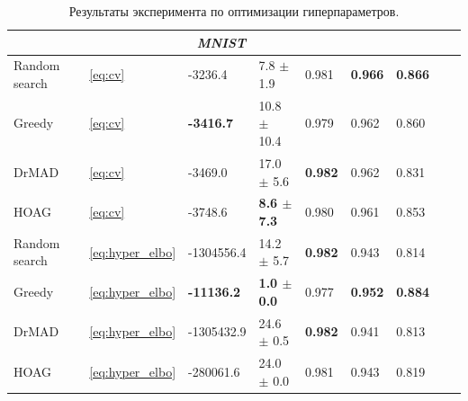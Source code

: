 \begin{table}
\begin{tabularx}{\textwidth}{ |X|X|X|X|X|X|X|X|X|}
\multicolumn{7}{|c|}{\textit{MNIST}}  \\
\hline
Random search & ~\eqref{eq:cv} & -3236.4  & 7.8 $\pm$ 1.9  &   0.981 & \bf 0.966 & \bf 0.866 \\
\hline
Greedy & ~\eqref{eq:cv} & \bf -3416.7 & 10.8 $\pm$ 10.4 & 0.979 & 0.962 & 0.860\\
\hline
DrMAD & ~\eqref{eq:cv} & -3469.0 & 17.0 $\pm$ 5.6 & \bf  0.982 & 0.962 & 0.831\\
\hline
HOAG & ~\eqref{eq:cv} & -3748.6 & \bf 8.6 $\pm$ 7.3&   0.980 &  0.961  & 0.853 \\
\hline
Random search & ~\eqref{eq:hyper_elbo} & -1304556.4 &  14.2 $\pm$ 5.7 &  \bf 0.982 & 0.943 & 0.814 \\
\hline
Greedy & ~\eqref{eq:hyper_elbo} & \bf -11136.2 & \bf 1.0 $\pm$ 0.0  &  0.977 & \bf 0.952 & \bf 0.884\\
\hline
DrMAD & ~\eqref{eq:hyper_elbo} & -1305432.9 & 24.6 $\pm$ 0.5  & \bf 0.982 & 0.941 & 0.813 \\
\hline
HOAG & ~\eqref{eq:hyper_elbo} &  -280061.6 & 24.0 $\pm$ 0.0  & 0.981 & 0.943 & 0.819\\
\hline


\hline
\end{tabularx}
\caption{Результаты эксперимента по оптимизации гиперпараметров.}
\label{table:table}
\end{table}


